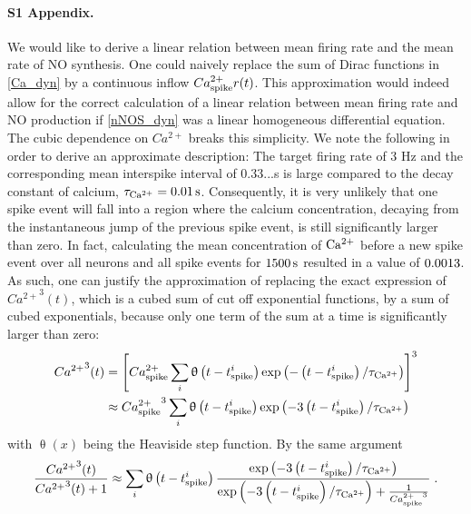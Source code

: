 \documentclass[10pt,letterpaper]{article}
\begin{document}
\paragraph*{S1 Appendix.}
\label{S1_Appendix}
We would like to derive a linear relation between mean firing rate  and the mean rate of NO synthesis. One could naively replace the sum of Dirac functions in \eqref{Ca_dyn} by a continuous inflow $Ca^{2+}_{\rm spike} r(t)$. This approximation would indeed allow for the correct calculation of a linear relation between mean firing rate and NO production if \eqref{nNOS_dyn} was a linear homogeneous differential equation. The cubic dependence on $Ca^{2+}$ breaks this simplicity. We note the following in order to derive an approximate description: The target firing rate of 3 Hz and the corresponding mean interspike interval of 0.33...s is large compared to the decay constant of calcium, $\tau_{\rm Ca^{2+}} = \mathrm{0.01\,s}$. Consequently, it is very unlikely that one spike event will fall into a region where the calcium concentration, decaying from the instantaneous jump of the previous spike event, is still significantly larger than zero. In fact, calculating the mean concentration of $\rm Ca^{2+}$ before a new spike event over all neurons and all spike events for $\rm 1500\,s$ resulted in a value of $\rm 0.0013$. As such, one can justify the approximation of replacing the exact expression of ${Ca^{2+}}^3(t)$, which is a cubed sum of cut off exponential functions, by a sum of cubed exponentials, because only one term of the sum at a time is significantly larger than zero:
\begin{equation}
\begin{split}
{Ca^{2+}}^3(t) &= \left[ Ca^{2+}_{\rm spike} \sum_{i} \mathrm{\uptheta} \left( t-t^i_{\rm spike} \right) \exp \left( - \left( t-t^i_{\rm spike} \right) /\tau_{\rm Ca^{2+}} \right) \right]^3 \\
&\approx {Ca_{\rm spike}^{2+}}^3 \sum_{i} \uptheta \left( t-t^i_{\rm spike} \right) \exp \left( -3 \left( t-t^i_{\rm spike} \right) /\tau_{\rm Ca^{2+}} \right) 
\end{split} \label{cubic_approx_1}			
\end{equation}
with $\uptheta(x)$ being the Heaviside step function. By the same argument
\begin{equation}
\frac{{Ca^{2+}}^3(t)}{{Ca^{2+}}^3(t)+1} \approx \sum_{i} \uptheta \left( t-t^i_{\rm spike} \right) \frac{ \exp \left( -3 \left( t-t^i_{\rm spike} \right) /\tau_{\rm Ca^{2+}} \right) }{\exp \left( -3 \left( t-t^i_{\rm spike} \right) /\tau_{\rm Ca^{2+}} \right) + \frac{1}{{Ca_{\rm spike}^{2+}}^3}} \; .
\end{equation}
\end{document}
